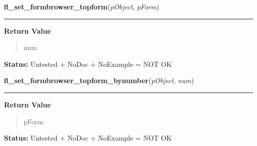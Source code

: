     \label{xformslib:library:fl_set_formbrowser_topform}

    \vspace{0.5ex}

\hspace{.8\funcindent}\begin{boxedminipage}{\funcwidth}

    \raggedright \textbf{fl\_set\_formbrowser\_topform}(\textit{pObject}, \textit{pForm})

    \vspace{-1.5ex}

    \rule{\textwidth}{0.5\fboxrule}
\setlength{\parskip}{2ex}
\setlength{\parskip}{1ex}
      \textbf{Return Value}
    \vspace{-1ex}

      \begin{quote}
      num

      \end{quote}

\textbf{Status:} Untested + NoDoc + NoExample = NOT OK



    \end{boxedminipage}

    \label{xformslib:library:fl_set_formbrowser_topform_bynumber}

    \vspace{0.5ex}

\hspace{.8\funcindent}\begin{boxedminipage}{\funcwidth}

    \raggedright \textbf{fl\_set\_formbrowser\_topform\_bynumber}(\textit{pObject}, \textit{num})

    \vspace{-1.5ex}

    \rule{\textwidth}{0.5\fboxrule}
\setlength{\parskip}{2ex}
\setlength{\parskip}{1ex}
      \textbf{Return Value}
    \vspace{-1ex}

      \begin{quote}
      pForm

      \end{quote}

\textbf{Status:} Untested + NoDoc + NoExample = NOT OK



    \end{boxedminipage}

